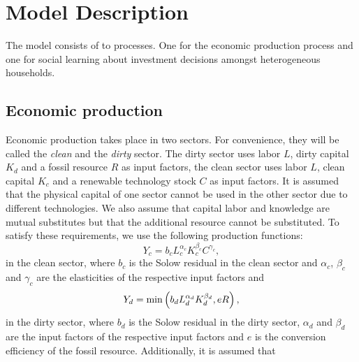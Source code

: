 \section{Model Description}
\label{Model_Description}
The model consists of to processes. One for the economic production process and one for social learning about investment decisions amongst heterogeneous households.

\subsection{Economic production}
\label{model_description}

Economic production takes place in two sectors. For convenience, they will be called the \textit{clean} and the \textit{dirty} sector. The dirty sector uses labor $L$, dirty capital $K_d$ and a fossil resource $R$ as input factors, the clean sector uses labor $L$, clean capital $K_c$ and a renewable technology stock $C$ as input factors. It is assumed that the physical capital of one sector cannot be used in the other sector due to different technologies. We also assume that capital labor and knowledge are mutual substitutes but that the additional resource cannot be substituted. To satisfy these requirements, we use the following production functions:
\begin{equation}
	Y_c = b_c L_c^{\alpha_c}K_c^{\beta_c}C^{\gamma_c}, 
	\label{clean_production}
\end{equation}
in the clean sector, where $b_c$ is the Solow residual in the clean sector and $\alpha_c$, $\beta_c$ and $\gamma_c$ are the elasticities of the respective input factors and
\begin{equation}
	Y_d = {\rm min}\left( b_d L_d^{\alpha_d}K_d^{\beta_d}, e R \right),
	\label{dirty_production}
\end{equation}
in the dirty sector, where $b_d$ is the Solow residual in the dirty sector, $\alpha_d$ and $\beta_d$ are the input factors of the respective input factors and $e$ is the conversion efficiency of the fossil resource.
Additionally, it is assumed that
